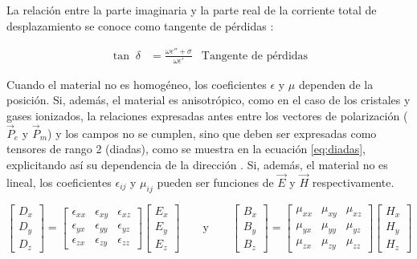 La relación entre la parte imaginaria y la parte real de la corriente total de desplazamiento se conoce como tangente de pérdidas \cite{Pozar:MwEngineering}:

\begin{align}
	\tan \; \delta &= \frac{\omega \epsilon'' + \sigma}{\omega \epsilon'} & \text{Tangente de pérdidas}
\end{align}

Cuando el material no es homogéneo, los coeficientes $\epsilon$ y $\mu$ dependen de la posición. Si, además, el material es anisotrópico, como en el caso de los cristales y gases ionizados, la relaciones expresadas antes entre los vectores de polarización ($\vec{P}_e$ y $\vec{P}_m$) y los campos no se cumplen, sino que deben ser expresadas como tensores de rango 2 (diadas), como se muestra en la ecuación \ref{eq:diadas}, explicitando así su dependencia de la dirección \cite{Collin:GuidedWaves}. Si, además, el material no es lineal, los coeficientes $\epsilon_{ij}$ y $\mu_{ij}$ pueden ser funciones de $\vec{E}$ y $\vec{H}$ respectivamente.

\begin{equation} \label{eq:diadas}
\begin{bmatrix}
D_x \\
D_y \\
D_z
\end{bmatrix}
=
\begin{bmatrix}
\epsilon_{xx} & \epsilon_{xy} & \epsilon_{xz} \\
\epsilon_{yx} & \epsilon_{yy} & \epsilon_{yz} \\
\epsilon_{zx} & \epsilon_{zy} & \epsilon_{zz}
\end{bmatrix}
\begin{bmatrix}
E_x \\
E_y \\
E_z
\end{bmatrix}
\qquad\text{y}\qquad
\begin{bmatrix}
B_x \\
B_y \\
B_z
\end{bmatrix}
=
\begin{bmatrix}
\mu_{xx} & \mu_{xy} & \mu_{xz} \\
\mu_{yx} & \mu_{yy} & \mu_{yz} \\
\mu_{zx} & \mu_{zy} & \mu_{zz}
\end{bmatrix}
\begin{bmatrix}
H_x \\
H_y \\
H_z
\end{bmatrix}
\end{equation}

